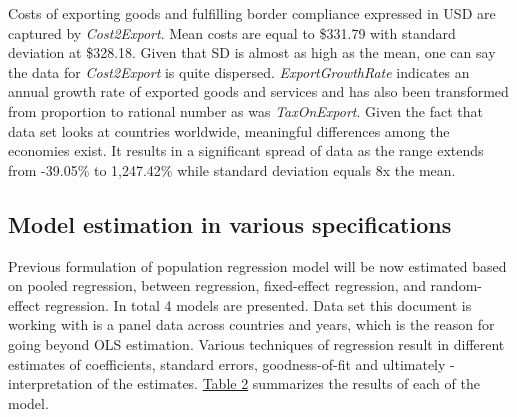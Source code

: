 \documentclass{article}
\begin{document}
Costs of exporting goods and fulfilling border compliance expressed in USD are captured by \textit{Cost2Export}. Mean costs are equal to \$331.79 with standard deviation at \$328.18. Given that SD is almost as high as the mean, one can say the data for \textit{Cost2Export} is quite dispersed. \textit{ExportGrowthRate} indicates an annual growth rate of exported goods and services and has also been transformed from proportion to rational number as was \textit{TaxOnExport}. Given the fact that data set looks at countries worldwide, meaningful differences among the economies exist. It results in a significant spread of data as the range extends from -39.05\% to 1,247.42\% while standard deviation equals 8x the mean.

\subsection{Model estimation in various specifications}

Previous formulation of population regression model will be now estimated based on pooled regression, between regression, fixed-effect regression, and random-effect regression. In total 4 models are presented. Data set this document is working with is a panel data across countries and years, which is the reason for going beyond OLS estimation. Various techniques of regression result in different estimates of coefficients, standard errors, goodness-of-fit and ultimately - interpretation of the estimates. \hyperref[tab:4models]{Table 2} summarizes the results of each of the model.
\end{document}
